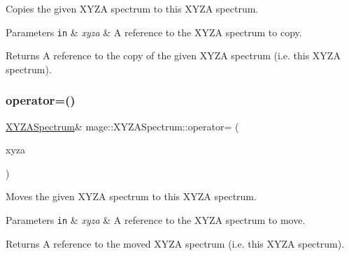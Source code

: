 Copies the given X\+Y\+ZA spectrum to this X\+Y\+ZA spectrum.


\begin{DoxyParams}[1]{Parameters}
\mbox{\tt in}  & {\em xyza} & A reference to the X\+Y\+ZA spectrum to copy. \\
\hline
\end{DoxyParams}
\begin{DoxyReturn}{Returns}
A reference to the copy of the given X\+Y\+ZA spectrum (i.\+e. this X\+Y\+ZA spectrum). 
\end{DoxyReturn}
\hypertarget{structmage_1_1_x_y_z_a_spectrum_a7afaa89a90d8444691b74c1f4b257aec}{}\label{structmage_1_1_x_y_z_a_spectrum_a7afaa89a90d8444691b74c1f4b257aec} 
\subsubsection{\texorpdfstring{operator=()}{operator=()}\hspace{0.1cm}{\footnotesize\ttfamily [2/2]}}
{\footnotesize\ttfamily \hyperlink{structmage_1_1_x_y_z_a_spectrum}{X\+Y\+Z\+A\+Spectrum}\& mage\+::\+X\+Y\+Z\+A\+Spectrum\+::operator= (\begin{DoxyParamCaption}\item[{\hyperlink{structmage_1_1_x_y_z_a_spectrum}{X\+Y\+Z\+A\+Spectrum} \&\&}]{xyza }\end{DoxyParamCaption})\hspace{0.3cm}{\ttfamily [default]}}

Moves the given X\+Y\+ZA spectrum to this X\+Y\+ZA spectrum.


\begin{DoxyParams}[1]{Parameters}
\mbox{\tt in}  & {\em xyza} & A reference to the X\+Y\+ZA spectrum to move. \\
\hline
\end{DoxyParams}
\begin{DoxyReturn}{Returns}
A reference to the moved X\+Y\+ZA spectrum (i.\+e. this X\+Y\+ZA spectrum). 
\end{DoxyReturn}
